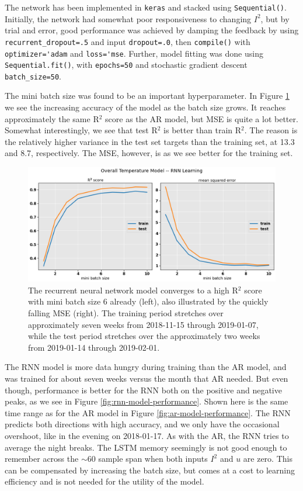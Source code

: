 \documentclass[]{article}
\begin{document}
The network has been implemented in \lstinline|keras| and stacked using \lstinline|Sequential()|. Initially, the network had somewhat poor responsiveness to changing $I^2$, but by trial and error, good performance was achieved by damping the feedback by using \lstinline|recurrent_dropout=.5| and input \lstinline|dropout=.0|, then \lstinline|compile()| with \lstinline|optimizer='adam| and \lstinline|loss='mse|. Further, model fitting was done using \lstinline|Sequential.fit()|, with \lstinline|epochs=50| and stochastic gradient descent \lstinline|batch_size=50|.

The mini batch size was found to be an important hyperparameter. In Figure \ref{fig:rnn-model-learning} we see the increasing accuracy of the model as the batch size grows. It reaches approximately the same R$^2$ score as the AR model, but MSE is quite a lot better. Somewhat interestingly, we see that test R$^2$ is better than train R$^2$. The reason is the relatively higher variance in the test set targets than the training set, at 13.3 and 8.7, respectively. The MSE, however, is as we see better for the training set.

\begin{figure}[!h]
	\centering
	\includegraphics[width=1\linewidth]{./figs/rnn-model-learning.png}
	\caption{The recurrent neural network model converges to a high R$^2$ score with mini batch size 6 already (left), also illustrated by the quickly falling MSE (right). The training period stretches over approximately seven weeks from 2018-11-15 through 2019-01-07, while the test period stretches over the approximately two weeks from 2019-01-14 through 2019-02-01.}
	\label{fig:rnn-model-learning}
\end{figure}

The RNN model is more data hungry during training than the AR model, and was trained for about seven weeks versus the month that AR needed. But even though, performance is better for the RNN both on the positive and negative peaks, as we see in Figure \ref{fig:rnn-model-performance}. Shown here is the same time range as for the AR model in Figure \ref{fig:ar-model-performance}. The RNN predicts both directions with high accuracy, and we only have the occasional overshoot, like in the evening on 2018-01-17. As with the AR, the RNN tries to average the night breaks. The LSTM memory seemingly is not good enough to remember across the $\sim 60$ sample span when both inputs $I^2$ and $u$ are zero. This can be compensated by increasing the batch size, but comes at a cost to learning efficiency and is not needed for the utility of the model.
\end{document}
